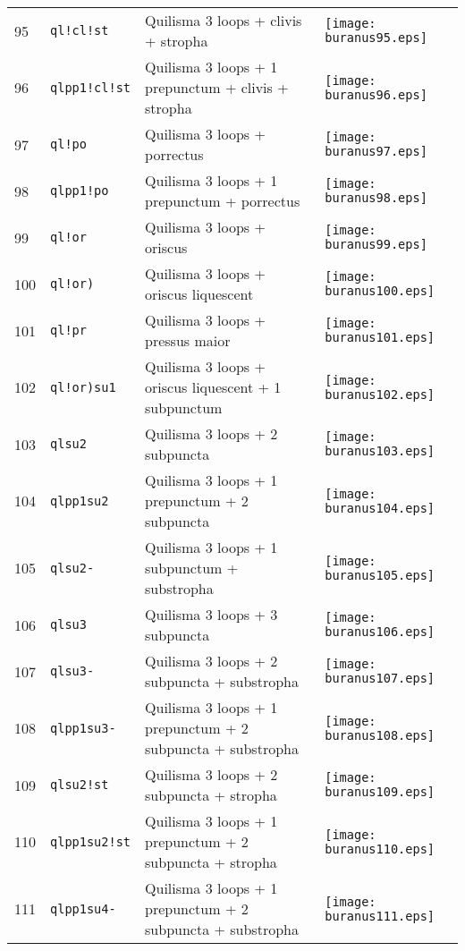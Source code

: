 \documentclass{scrarticle}
\begin{document}
\begin{longtable}{l|l|l|l}
95 & \texttt{ql!cl!st} & Quilisma 3 loops + clivis + stropha & \texttt{[image: buranus95.eps]} \\
96 & \texttt{qlpp1!cl!st} & Quilisma 3 loops + 1 prepunctum + clivis + stropha & \texttt{[image: buranus96.eps]} \\
97 & \texttt{ql!po} & Quilisma 3 loops + porrectus & \texttt{[image: buranus97.eps]} \\
98 & \texttt{qlpp1!po} & Quilisma 3 loops + 1 prepunctum + porrectus & \texttt{[image: buranus98.eps]} \\
99 & \texttt{ql!or} & Quilisma 3 loops + oriscus & \texttt{[image: buranus99.eps]} \\
100 & \texttt{ql!or)} & Quilisma 3 loops + oriscus liquescent & \texttt{[image: buranus100.eps]} \\
101 & \texttt{ql!pr} & Quilisma 3 loops + pressus maior & \texttt{[image: buranus101.eps]} \\
102 & \texttt{ql!or)su1} & Quilisma 3 loops + oriscus liquescent + 1 subpunctum & \texttt{[image: buranus102.eps]} \\
103 & \texttt{qlsu2} & Quilisma 3 loops + 2 subpuncta & \texttt{[image: buranus103.eps]} \\
104 & \texttt{qlpp1su2} & Quilisma 3 loops + 1 prepunctum + 2 subpuncta & \texttt{[image: buranus104.eps]} \\
105 & \texttt{qlsu2-} & Quilisma 3 loops + 1 subpunctum + substropha & \texttt{[image: buranus105.eps]} \\
106 & \texttt{qlsu3} & Quilisma 3 loops + 3 subpuncta & \texttt{[image: buranus106.eps]} \\
107 & \texttt{qlsu3-} & Quilisma 3 loops + 2 subpuncta + substropha & \texttt{[image: buranus107.eps]} \\
108 & \texttt{qlpp1su3-} & Quilisma 3 loops + 1 prepunctum + 2 subpuncta + substropha & \texttt{[image: buranus108.eps]} \\
109 & \texttt{qlsu2!st} & Quilisma 3 loops + 2 subpuncta + stropha & \texttt{[image: buranus109.eps]} \\
110 & \texttt{qlpp1su2!st} & Quilisma 3 loops + 1 prepunctum + 2 subpuncta + stropha & \texttt{[image: buranus110.eps]} \\
111 & \texttt{qlpp1su4-} & Quilisma 3 loops + 1 prepunctum + 2 subpuncta + substropha & \texttt{[image: buranus111.eps]} \\

\end{longtable}
\end{document}
